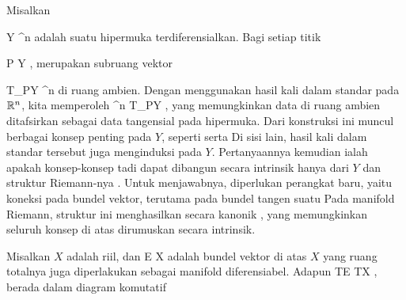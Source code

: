 \setcounter{section}{24}

Misalkan

\mavergleichskette
{\vergleichskette
{ Y
}
{ \subseteq }{ \R^n
}
{  }{
}
{    }{
}
{   }{
}
}
{}{}{ }
adalah suatu hipermuka terdiferensialkan. Bagi setiap titik

\mavergleichskette
{\vergleichskette
{ P
}
{ \in }{ Y
}
{  }{
}
{    }{
}
{   }{
}
}
{}{}{,}
merupakan subruang vektor

\mavergleichskette
{\vergleichskette
{ T_PY
}
{ \subseteq }{ \R^n
}
{  }{
}
{    }{
}
{   }{
}
}
{}{}{}
di ruang ambien. Dengan menggunakan hasil kali dalam standar pada ${\mathbb R}^n$, kita memperoleh
 {\R^n } { T_PY
} {,}
yang memungkinkan data di ruang ambien ditafsirkan sebagai data tangensial pada hipermuka. Dari konstruksi ini muncul berbagai konsep penting pada $Y$, seperti
serta
Di sisi lain, hasil kali dalam standar tersebut juga menginduksi
pada $Y$. Pertanyaannya kemudian ialah apakah konsep-konsep tadi dapat dibangun secara intrinsik hanya dari $Y$ dan struktur Riemann-nya
 {} {.}
Untuk menjawabnya, diperlukan perangkat baru, yaitu koneksi pada bundel vektor, terutama pada bundel tangen suatu
Pada manifold Riemann, struktur ini menghasilkan secara kanonik  {}
 {} {,}
yang memungkinkan seluruh konsep di atas dirumuskan secara intrinsik.


Misalkan $X$ adalah
riil, dan
 { E } { X
} {}
adalah bundel vektor di atas $X$ yang ruang totalnya juga diperlakukan sebagai manifold diferensiabel. Adapun
 {TE} {TX
} {,}
berada dalam diagram komutatif

 {  }

